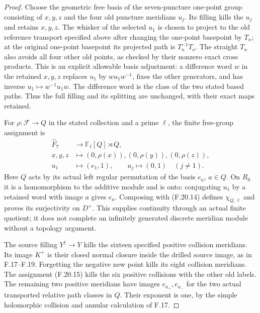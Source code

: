 \begin{proof}
Choose the geometric free basis of the seven-puncture
one-point group consisting of $x,y,z$ and the four old
puncture meridians $u_j$. Its filling kills the $u_j$
and retains $x,y,z$. The whisker of the selected
$u_1$ is chosen to project to the old reference
transport specified above after changing the
one-point basepoint by $T_n$; at the original
one-point basepoint its projected path is
$T_n^{-1}T_o$. The straight $T_n$ also avoids
all four other old points, as checked by their
nonzero exact cross products.
This is an explicit
allowable basis adjustment: a difference word $w$
in the retained $x,y,z$ replaces $u_1$ by
$wu_1w^{-1}$, fixes the other generators, and has
inverse $u_1\mapsto w^{-1}u_1w$.
The difference word is the class of the two stated
based paths. Thus the full filling and its splitting
are unchanged, with their exact maps retained.

For $\rho:\mathcal F\to Q$ in the stated collection
and a prime $\ell$, the finite free-group assignment is
\[
 \begin{aligned}
 \widehat F_7&\longrightarrow
                    \mathbb F_\ell[Q]\rtimes Q,\\
 x,y,z&\longmapsto(0,\rho(x)),(0,\rho(y)),(0,\rho(z)),\\
 u_1&\longmapsto(e_1,1),\qquad
 u_j\longmapsto(0,1)\quad(j\ne1).
 \end{aligned}                                                \tag{F.20.15}
\]
Here $Q$ acts by its actual left regular permutation
of the basis $e_a$, $a\in Q$.
On $R_0$ it is a homomorphism to the additive module
and is onto: conjugating $u_1$ by a retained word
with image $a$ gives $e_a$.
Composing with (F.20.14) defines $\chi_{Q,\ell}$
and proves its surjectivity on $D^+$.
This supplies continuity through an actual finite
quotient; it does not complete an infinitely generated
discrete meridian module without a topology argument.

The source filling $Y^\dagger\to Y$ kills the sixteen
specified positive collision meridians. Its image
$K^+$ is their closed normal closure inside the
drilled source image, as in F.17--F.19.
Forgetting the negative new point kills its eight
collision meridians. The assignment (F.20.15) kills
the six positive collisions with the other old labels.
The remaining two positive meridians have images
$e_{a_+},e_{a_-}$ for the two actual transported
relative path classes in $Q$.
Their exponent is one, by the simple holomorphic
collision and annular calculation of F.17.


\end{proof}
